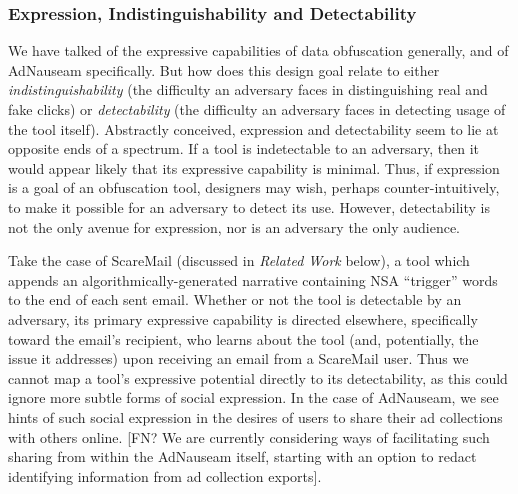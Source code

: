 \documentclass[conference]{IEEEtran}
\begin{document}

\subsubsection{Expression, Indistinguishability and Detectability}

We have talked of the expressive capabilities of data obfuscation generally, and of AdNauseam specifically. But how does this design goal relate to either \emph{indistinguishability} (the difficulty an adversary faces in distinguishing real and fake clicks) or \emph{detectability} (the difficulty an adversary faces in detecting usage of the tool itself). Abstractly conceived, expression and detectability seem to lie at opposite ends of a spectrum. If a tool is indetectable to an adversary, then it would appear likely that its expressive capability is minimal. Thus, if expression is a goal of an obfuscation tool, designers may wish, perhaps counter-intuitively, to make it possible for an adversary to detect its use. However, detectability is not the only avenue for expression, nor is an adversary the only audience.

Take the case of ScareMail (discussed in \emph{Related Work} below), a tool which appends an algorithmically-generated narrative containing NSA “trigger” words to the end of each sent email. Whether or not the tool is detectable by an adversary, its primary expressive capability is directed elsewhere, specifically toward the email's recipient, who learns about the tool (and, potentially, the issue it addresses) upon receiving an email from a ScareMail user. Thus we cannot map a tool's expressive potential directly to its detectability, as this could ignore more subtle forms of social expression. In the case of AdNauseam, we see hints of such social expression in the desires of users to share their ad collections with others online. [FN? We are currently considering ways of facilitating such sharing from within the AdNauseam itself, starting with an option to redact identifying information from ad collection exports].
\end{document}
